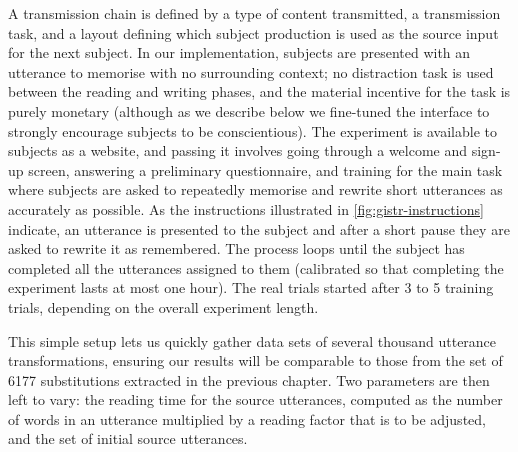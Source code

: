 \documentclass[a4paper,fleqn]{cas-dc}
\begin{document}
A transmission chain is defined by a type of content transmitted, a transmission
task, and a layout defining which subject production is used as the source input
for the next subject. In our implementation, subjects are presented with an
utterance to memorise with no surrounding context; no distraction task is used
between the reading and writing phases, and the material incentive for the task
is purely monetary (although as we describe below we fine-tuned the interface to
strongly encourage subjects to be conscientious). The experiment is available to
subjects as a website, and passing it involves going through a welcome and
sign-up screen, answering a preliminary questionnaire, and training for the main
task where subjects are asked to repeatedly memorise and rewrite short
utterances as accurately as possible. As the instructions illustrated in
\cref{fig:gistr-instructions} indicate, an utterance is presented to the subject
and after a short pause they are asked to rewrite it as remembered. The process
loops until the subject has completed all the utterances assigned to them
(calibrated so that completing the experiment lasts at most one hour). The real
trials started after 3 to 5 training trials, depending on the overall experiment
length.

This simple setup lets us quickly gather data sets of several thousand
utterance transformations, ensuring our results will be comparable to
those from the set of \num{6177} substitutions extracted in the previous
chapter. Two parameters are then left to vary: the reading time for the
source utterances, computed as the number of words in an utterance
multiplied by a reading factor that is to be adjusted, and the set of
initial source utterances.
\end{document}

